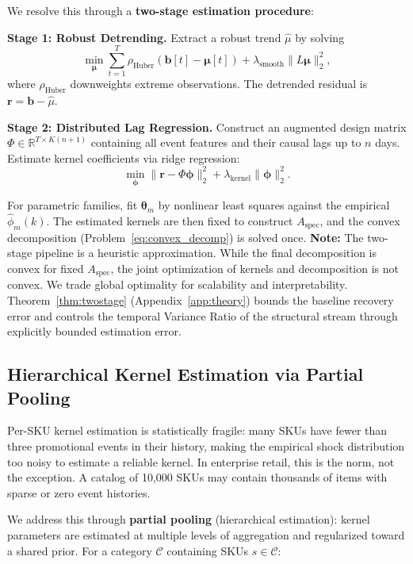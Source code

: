 \documentclass[10pt]{article} %
\theoremstyle{plain}
\theoremstyle{definition}
\newcommand{\R}{\mathbb{R}}
\newcommand{\Aspec}{A_{\text{spec}}}
\newcommand{\bvec}{\mathbf{b}}
\begin{document}
We resolve this through a \textbf{two-stage estimation procedure}:

\textbf{Stage 1: Robust Detrending.} Extract a robust trend $\hat{\mu}$ by solving
\begin{equation}
\min_{\boldsymbol{\mu}} \sum_{t=1}^{T} \rho_{\text{Huber}}(\bvec[t] - \boldsymbol{\mu}[t]) + \lambda_{\text{smooth}} \| L \boldsymbol{\mu} \|_{2}^{2},
\end{equation}
where $\rho_{\text{Huber}}$ downweights extreme observations. The detrended residual is $\mathbf{r} = \bvec - \hat{\mu}$.

\textbf{Stage 2: Distributed Lag Regression.} Construct an augmented design matrix $\Phi \in \R^{T \times K(n+1)}$ containing all event features and their causal lags up to $n$ days. Estimate kernel coefficients via ridge regression:
\begin{equation}
\min_{\boldsymbol{\phi}} \| \mathbf{r} - \Phi \boldsymbol{\phi} \|_{2}^{2} + \lambda_{\text{kernel}} \| \boldsymbol{\phi} \|_{2}^{2}.
\end{equation}

For parametric families, fit $\boldsymbol{\theta}_m$ by nonlinear least squares against the empirical $\hat{\phi}_m(k)$. The estimated kernels are then fixed to construct $\Aspec$, and the convex decomposition (Problem~\eqref{eq:convex_decomp}) is solved once. \textbf{Note:} The two-stage pipeline is a heuristic approximation. While the final decomposition is convex for fixed $\Aspec$, the joint optimization of kernels and decomposition is not convex. We trade global optimality for scalability and interpretability. Theorem~\ref{thm:twostage} (Appendix~\ref{app:theory}) bounds the baseline recovery error and controls the temporal Variance Ratio of the structural stream through explicitly bounded estimation error.

\subsection{Hierarchical Kernel Estimation via Partial Pooling}

Per-SKU kernel estimation is statistically fragile: many SKUs have fewer than three promotional events in their history, making the empirical shock distribution too noisy to estimate a reliable kernel. In enterprise retail, this is the norm, not the exception. A catalog of 10,000 SKUs may contain thousands of items with sparse or zero event histories.

We address this through \textbf{partial pooling} (hierarchical estimation): kernel parameters are estimated at multiple levels of aggregation and regularized toward a shared prior. For a category $\mathcal{C}$ containing SKUs $s \in \mathcal{C}$:
\end{document}
